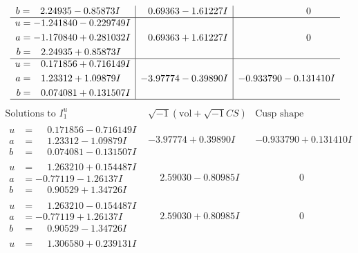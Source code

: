\documentclass[1p]{elsarticle_modified}
\theoremstyle{definition}
\newcommand{\I}{\sqrt{-1}}
\begin{document}
$$\begin{array}{c|c|c}
\begin{aligned}
b &= \phantom{-}2.24935 - 0.85873 I\end{aligned}
 & \phantom{-}0.69363 - 1.61227 I & \phantom{-0.000000 } 0 \\ \hline\begin{aligned}
u &= -1.241840 - 0.229749 I \\
a &= -1.170840 + 0.281032 I \\
b &= \phantom{-}2.24935 + 0.85873 I\end{aligned}
 & \phantom{-}0.69363 + 1.61227 I & \phantom{-0.000000 } 0 \\ \hline\begin{aligned}
u &= \phantom{-}0.171856 + 0.716149 I \\
a &= \phantom{-}1.23312 + 1.09879 I \\
b &= \phantom{-}0.074081 + 0.131507 I\end{aligned}
 & -3.97774 - 0.39890 I & -0.933790 - 0.131410 I\\
 \hline 
 \end{array}$$\newpage$$\begin{array}{c|c|c}  
\text{Solutions to }I^u_{1}& \I (\text{vol} + \sqrt{-1}CS) & \text{Cusp shape}\\
 \hline 
\begin{aligned}
u &= \phantom{-}0.171856 - 0.716149 I \\
a &= \phantom{-}1.23312 - 1.09879 I \\
b &= \phantom{-}0.074081 - 0.131507 I\end{aligned}
 & -3.97774 + 0.39890 I & -0.933790 + 0.131410 I \\ \hline\begin{aligned}
u &= \phantom{-}1.263210 + 0.154487 I \\
a &= -0.77119 - 1.26137 I \\
b &= \phantom{-}0.90529 + 1.34726 I\end{aligned}
 & \phantom{-}2.59030 - 0.80985 I & \phantom{-0.000000 } 0 \\ \hline\begin{aligned}
u &= \phantom{-}1.263210 - 0.154487 I \\
a &= -0.77119 + 1.26137 I \\
b &= \phantom{-}0.90529 - 1.34726 I\end{aligned}
 & \phantom{-}2.59030 + 0.80985 I & \phantom{-0.000000 } 0 \\ \hline\begin{aligned}
u &= \phantom{-}1.306580 + 0.239131 I \\

\end{aligned}
\end{array}$$
\end{document}
